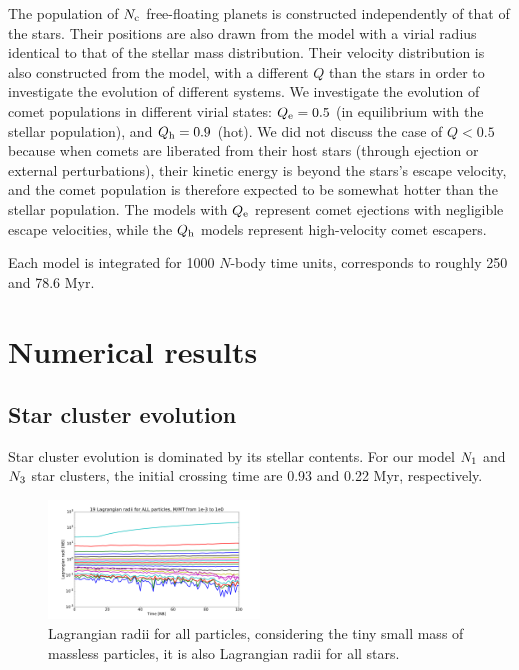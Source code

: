 \documentclass[usenatbib]{mn2e}
\newcommand{\ncomets}{N_{\rm c}}
\newcommand{\qe}{Q_{\rm e}}
\newcommand{\qh}{Q_{\rm h}}
\newcommand{\nna}{N_{\rm 1}}
\newcommand{\nnc}{N_{\rm 3}}
\begin{document}
The population of $\ncomets$ free-floating planets is constructed independently of that of the stars. Their positions are also drawn from the \cite{Plummer:1911aa} model with a virial radius identical to that of the stellar mass distribution. Their velocity distribution is also constructed from the \cite{Plummer:1911aa} model, with a different $Q$ than the stars in order to investigate the evolution of different systems. We investigate the evolution of comet populations in different virial states:  $\qe=0.5$ (in equilibrium with the stellar population), and $\qh=0.9$ (hot). We did not discuss the case of $Q < 0.5$ because when comets are liberated from their host stars (through ejection or external perturbations), their kinetic energy is beyond the stars's escape velocity, and the comet population is therefore expected to be somewhat hotter than the stellar population. The models with $\qe$ represent comet ejections with negligible escape velocities, while the $\qh$ models represent high-velocity comet escapers.

Each model is integrated for 1000 $N$-body time units, corresponds to roughly 250 and 78.6 Myr. 



\section{Numerical results}\label{section:results}

\subsection{Star cluster evolution}

Star cluster evolution is dominated by its stellar contents. For our model  $\nna$ and $\nnc$ star clusters, the initial crossing time are 0.93 and 0.22 Myr, respectively.

\begin{figure}
  \centering
  \includegraphics[width=0.5\textwidth,height=!]{lagrALL.pdf}
  \caption{Lagrangian radii for all particles, considering the tiny small mass of massless particles, it is also Lagrangian radii for all stars.}
  \label{fig:lagrALL}
\end{figure}
\end{document}
